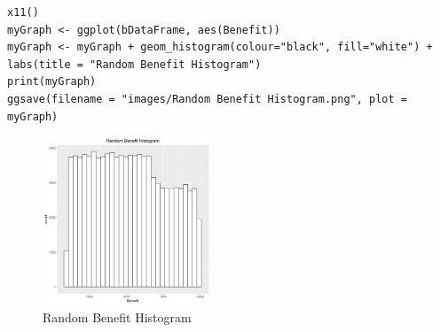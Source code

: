\documentclass[12pt]{article}
\begin{document}
\pagebreak


\begin{lstlisting}[caption={Random Benefit Histogram},label={list:L11}]
x11()
myGraph <- ggplot(bDataFrame, aes(Benefit))
myGraph <- myGraph + geom_histogram(colour="black", fill="white") + labs(title = "Random Benefit Histogram")
print(myGraph)
ggsave(filename = "images/Random Benefit Histogram.png", plot = myGraph)
\end{lstlisting}

\begin{figure}[h]
	\centering
	\includegraphics[width=0.5\linewidth, height=5cm]{S3.png}
	\caption{Random Benefit Histogram }
	
\end{figure}
\end{document}
